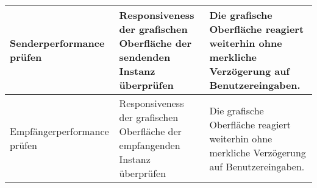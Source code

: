 \begin{table}[h]
\begin{center}
\begin{tabular}{|p{3.5cm}|p{5cm}|p{6.55cm}|}
                \hline
                    Senderperformance prüfen &
                    Responsiveness der grafischen Oberfläche der sendenden
                    Instanz überprüfen &
                    Die grafische Oberfläche reagiert weiterhin ohne merkliche
                    Verzögerung auf Benutzereingaben.\\
                \hline
                    Empfängerperformance prüfen &
                    Responsiveness der grafischen Oberfläche der empfangenden
                    Instanz überprüfen &
                    Die grafische Oberfläche reagiert weiterhin ohne merkliche
                    Verzögerung auf Benutzereingaben.\\
                \hline
            \end{tabular}
        \end{center}
    \end{table}

